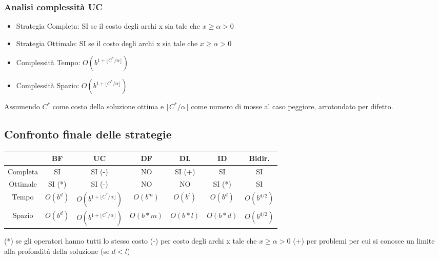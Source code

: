 \documentclass{article}
\begin{document}
\subsubsection{Analisi complessità UC}
\begin{itemize}
    \item Strategia Completa: SI se il costo degli archi x sia tale che $ x \geq \alpha > 0$
    \item Strategia Ottimale: SI se il costo degli archi x sia tale che $ x \geq \alpha > 0$
    \item Complessità Tempo: $O(b^{1+ \lfloor C^*/\alpha \rfloor})$
    \item Complessità Spazio: $O(b^{1+ \lfloor C^*/\alpha \rfloor})$
\end{itemize}
Assumendo $C^*$ come costo della soluzione ottima e $\lfloor C^*/\alpha \rfloor$ come numero di mosse al caso peggiore, arrotondato per difetto.

\subsection{Confronto finale delle strategie}
\begin{table} [H]
    \centering
    \begin{tabular}{|c|c|c|c|c|c|c|}
        \hline
                    & BF        & UC                                        & DF        & DL        & ID        & Bidir. \\ \hline
        Completa    & SI        & SI (-)                                    & NO        & SI (+)    & SI        & SI \\ 
        Ottimale    & SI (*)    & SI (-)                                    & NO        & NO        & SI (*)    & SI \\ 
        Tempo       & $O(b^d)$  & $O(b^{1+ \lfloor C^*/\alpha \rfloor})$    & $O(b^m)$  & $O(b^l)$  & $O(b^d)$  & $O(b^{d/2})$\\ 
        Spazio      & $O(b^d)$  & $O(b^{1+ \lfloor C^*/\alpha \rfloor})$    & $O(b*m)$  & $O(b*l)$  & $O(b*d)$  & $O(b^{d/2})$ \\
        \hline
    \end{tabular}
\end{table}
(*) se gli operatori hanno tutti lo stesso costo \newline
(-) per costo degli archi x tale che $ x \geq \alpha > 0$ \newline
(+) per problemi per cui si conosce un limite alla profondità della soluzione (se $d<l$)
\end{document}
